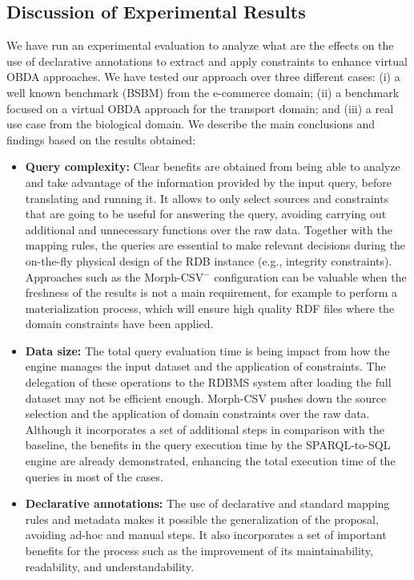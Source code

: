 \subsection{Discussion of Experimental Results}
\label{sec:discussion}
We have run an experimental evaluation to analyze what are the effects on the use of declarative annotations to extract and apply constraints to enhance virtual OBDA approaches. We have tested our approach over three different cases: (i) a well known benchmark (BSBM) from the e-commerce domain; (ii) a benchmark focused on a virtual OBDA approach for the transport domain; and (iii) a real use case from the biological domain. We describe the main conclusions and findings based on the results obtained:
\begin{itemize}
    \item \textbf{Query complexity:} Clear benefits are obtained from being able to analyze and take advantage of the information provided by the input query, before translating and running it. It allows to only select sources and constraints that are going to be useful for answering the query, avoiding carrying out additional and unnecessary functions over the raw data. Together with the mapping rules, the queries are essential to make relevant decisions during the on-the-fly physical design of the RDB instance (e.g., integrity constraints). Approaches such as the Morph-CSV$^-$ configuration can be valuable when the freshness of the results is not a main requirement, for example to perform a materialization process, which will ensure high quality RDF files where the domain constraints have been applied.
    \item \textbf{Data size:} The total query evaluation time is being impact from how the engine manages the input dataset and the application of constraints. The delegation of these operations to the RDBMS system after loading the full dataset may not be efficient enough. Morph-CSV pushes down the source selection and the application of domain constraints over the raw data. Although it incorporates a set of additional steps in comparison with the baseline, the benefits in the query execution time by the SPARQL-to-SQL engine are already demonstrated, enhancing the total execution time of the queries in most of the cases.
    \item \textbf{Declarative annotations:} The use of declarative and standard mapping rules and metadata makes it possible the generalization of the proposal, avoiding ad-hoc and manual steps. It also incorporates a set of important benefits for the process such as the improvement of its maintainability, readability, and understandability.

\end{itemize}
